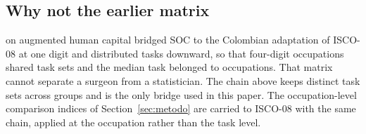 \subsection{Why not the earlier matrix}

\Trabajoprevio on augmented human capital \citeahc bridged SOC to the Colombian adaptation of ISCO-08 at one digit and distributed tasks downward, so that  four-digit occupations shared  task sets and the median task belonged to  occupations.
That matrix cannot separate a surgeon from a statistician.
The chain above keeps  distinct task sets across  groups and is the only bridge used in this paper.
The occupation-level comparison indices of Section~\ref{sec:metodo} are carried to ISCO-08 with the same chain, applied at the occupation rather than the task level.
